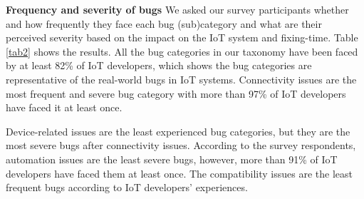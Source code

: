  \begin{table}[htbp]
\caption{Bug Categories with Positive Correlation}
\begin{center}
\label{tab:correlations}
\end{center}
\end{table}


\textbf{Frequency and severity of bugs}
We asked our survey participants whether and how frequently they face each bug (sub)category and what are their perceived severity based on the impact on the IoT system and fixing-time. Table \ref{tab2} shows the results.  All the bug categories in our taxonomy have been faced by at least 82\% of IoT developers, which shows the bug categories are representative of the real-world bugs in IoT systems. Connectivity issues are the most frequent and severe bug category with more than 97\% of IoT developers have faced it at least once. 


Device-related issues are the least experienced bug categories, but they are the most severe bugs after connectivity issues. According to the survey respondents, automation issues are the least severe bugs, however, more than 91\% of IoT developers have faced them at least once. The compatibility issues are the least frequent bugs according to IoT developers' experiences.


